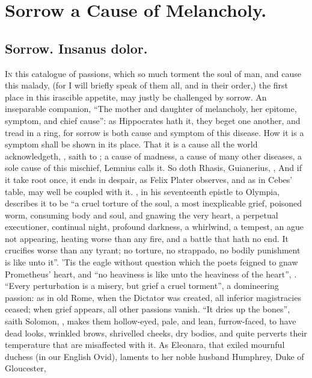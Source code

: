 \section{Sorrow a Cause of Melancholy.}

\subsection{Sorrow. \textlatin{Insanus dolor.}}

\lettrine{I}{n} this catalogue of passions, which so much torment the soul of
man, and cause this malady, (for I will briefly speak of them all, and in their
order,) the first place in this irascible appetite, may justly be challenged by
sorrow. An inseparable companion, \enquote{The mother and daughter
of melancholy, her epitome, symptom, and chief cause}: as Hippocrates hath it,
they beget one another, and tread in a ring, for sorrow is both cause and
symptom of this disease. How it is a symptom shall be shown in its place. That
it is a cause all the world acknowledgeth, , saith \Plutarch{} to \Apollonius{}; a cause
of madness, a cause of many other diseases, a sole cause of this mischief,
Lemnius calls it. So doth Rhasis,
 Guianerius,
, And if it take root once, it ends in
despair, as Felix Plater observes, and as in
Cebes' table, may well be coupled with it.
\Chrysostom{}, in his seventeenth epistle to Olympia,
describes it to be \enquote{a cruel torture of the soul, a most inexplicable grief,
poisoned worm, consuming body and soul, and gnawing the very heart, a perpetual
executioner, continual night, profound darkness, a whirlwind, a tempest, an
ague not appearing, heating worse than any fire, and a battle that hath no end.
It crucifies worse than any tyrant; no torture, no strappado, no bodily
punishment is like unto it}. 'Tis the eagle without question which the poets
feigned to gnaw Prometheus' heart, and \enquote{no heaviness is
like unto the heaviness of the heart}, .
\enquote{Every perturbation is a misery, but grief a cruel
torment}, a domineering passion: as in old Rome, when the Dictator was created,
all inferior magistracies ceased; when grief appears, all other passions
vanish. \enquote{It dries up the bones}, saith Solomon, , makes
them hollow-eyed, pale, and lean, furrow-faced, to have dead looks, wrinkled
brows, shrivelled cheeks, dry bodies, and quite perverts their temperature that
are misaffected with it. As Eleonara, that exiled mournful duchess (in our
English Ovid), laments to her noble husband Humphrey, Duke
of Gloucester,

